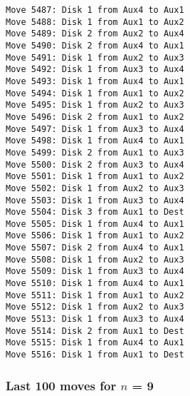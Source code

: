 \documentclass[11pt]{article}
\begin{document}
\begin{multicols}{2}
\begin{Verbatim}[fontsize=\small]
Move 5487: Disk 1 from Aux4 to Aux1
Move 5488: Disk 1 from Aux1 to Aux2
Move 5489: Disk 2 from Aux2 to Aux4
Move 5490: Disk 2 from Aux4 to Aux1
Move 5491: Disk 1 from Aux2 to Aux3
Move 5492: Disk 1 from Aux3 to Aux4
Move 5493: Disk 1 from Aux4 to Aux1
Move 5494: Disk 1 from Aux1 to Aux2
Move 5495: Disk 1 from Aux2 to Aux3
Move 5496: Disk 2 from Aux1 to Aux2
Move 5497: Disk 1 from Aux3 to Aux4
Move 5498: Disk 1 from Aux4 to Aux1
Move 5499: Disk 2 from Aux1 to Aux3
Move 5500: Disk 2 from Aux3 to Aux4
Move 5501: Disk 1 from Aux1 to Aux2
Move 5502: Disk 1 from Aux2 to Aux3
Move 5503: Disk 1 from Aux3 to Aux4
Move 5504: Disk 3 from Aux1 to Dest
Move 5505: Disk 1 from Aux4 to Aux1
Move 5506: Disk 1 from Aux1 to Aux2
Move 5507: Disk 2 from Aux4 to Aux1
Move 5508: Disk 1 from Aux2 to Aux3
Move 5509: Disk 1 from Aux3 to Aux4
Move 5510: Disk 1 from Aux4 to Aux1
Move 5511: Disk 1 from Aux1 to Aux2
Move 5512: Disk 1 from Aux2 to Aux3
Move 5513: Disk 1 from Aux3 to Aux4
Move 5514: Disk 2 from Aux1 to Dest
Move 5515: Disk 1 from Aux4 to Aux1
Move 5516: Disk 1 from Aux1 to Dest
\end{Verbatim}

\subsubsection*{Last 100 moves for $n$ = 9}


\end{multicols}
\end{document}
